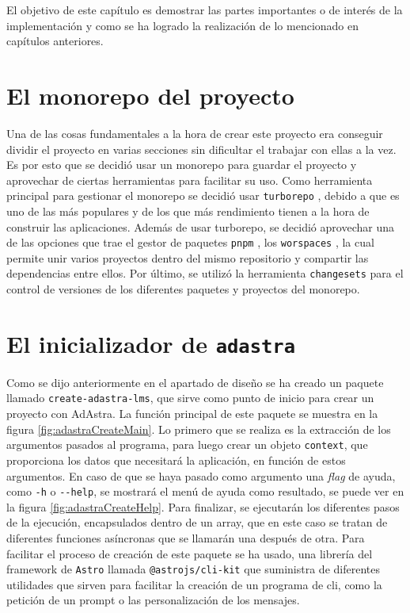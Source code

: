 El objetivo de este capítulo es demostrar las partes importantes o de interés de la implementación y como se ha logrado la realización de lo mencionado en capítulos anteriores.

\section{El monorepo del proyecto}

Una de las cosas fundamentales a la hora de crear este proyecto era conseguir dividir el proyecto en varias secciones sin dificultar el trabajar con ellas a la vez. Es por esto que se decidió usar un monorepo para guardar el proyecto y aprovechar de ciertas herramientas para facilitar su uso. Como herramienta principal para gestionar el monorepo se decidió usar \verb|turborepo| \cite{turborepo}, debido a que es uno de las más populares y de los que más rendimiento tienen a la hora de construir las aplicaciones. Además de usar turborepo, se decidió aprovechar una de las opciones que trae el gestor de paquetes \verb|pnpm| \cite{pnpm}, los \verb|worspaces| \cite{pnpm-workspaces}, la cual permite unir varios proyectos dentro del mismo repositorio y compartir las dependencias entre ellos. Por último, se utilizó la herramienta \verb|changesets| \cite{changesets} para el control de versiones de los diferentes paquetes y proyectos del monorepo.

\section{El inicializador de {\tt adastra}}

Como se dijo anteriormente en el apartado de diseño se ha creado un paquete llamado \verb|create-adastra-lms|, que sirve como punto de inicio para crear un proyecto con AdAstra. La función principal de este paquete se muestra en la figura \ref{fig:adastraCreateMain}. Lo primero que se realiza es la extracción de los argumentos pasados al programa, para luego crear un objeto \verb|context|, que proporciona los datos que necesitará la aplicación, en función de estos argumentos. En caso de que se haya pasado como argumento una \textit{flag} de ayuda, como \verb|-h| o \verb|--help|, se mostrará el menú de ayuda como resultado, se puede ver en la figura \ref{fig:adastraCreateHelp}. Para finalizar, se ejecutarán los diferentes pasos de la ejecución, encapsulados dentro de un array, que en este caso se tratan de diferentes funciones asíncronas que se llamarán una después de otra. Para facilitar el proceso de creación de este paquete se ha usado, una librería del framework de \verb|Astro| \cite{astro} llamada \verb|@astrojs/cli-kit| \cite{astro-cli} que suministra de diferentes utilidades que sirven para facilitar la creación de un programa de cli, como la petición de un prompt o las personalización de los mensajes. 

